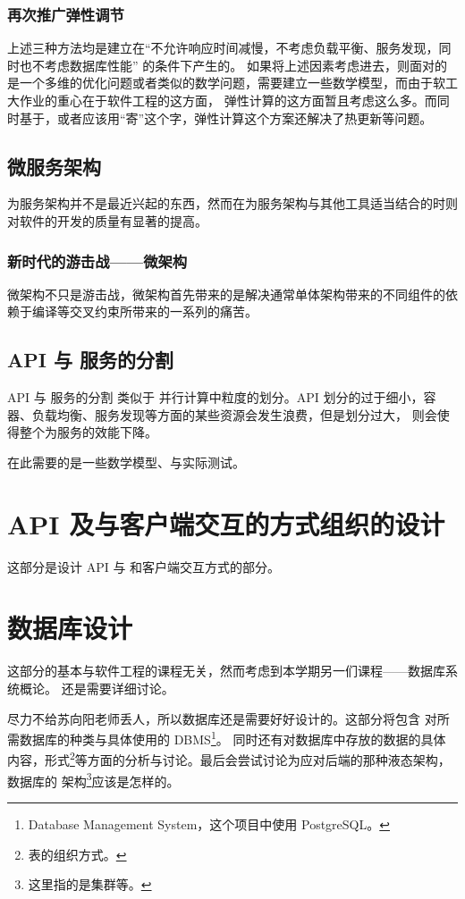 \subsubsection{再次推广弹性调节}
上述三种方法均是建立在“不允许响应时间减慢，不考虑负载平衡、服务发现，同时也不考虑数据库性能” 的条件下产生的。
如果将上述因素考虑进去，则面对的是一个多维的优化问题或者类似的数学问题，需要建立一些数学模型，而由于软工大作业的重心在于软件工程的这方面，
弹性计算的这方面暂且考虑这么多。而同时基于，或者应该用“寄”这个字，弹性计算这个方案还解决了热更新等问题。

\subsection{微服务架构}
为服务架构并不是最近兴起的东西，然而在为服务架构与其他工具适当结合的时则对软件的开发的质量有显著的提高。

\subsubsection{新时代的游击战——微架构}
微架构不只是游击战，微架构首先带来的是解决通常单体架构带来的不同组件的依赖于编译等交叉约束所带来的一系列的痛苦。

\subsection{API 与 服务的分割}
API 与 服务的分割 类似于 并行计算中粒度的划分。API 划分的过于细小，容器、负载均衡、服务发现等方面的某些资源会发生浪费，但是划分过大，
则会使得整个为服务的效能下降。

在此需要的是一些数学模型、与实际测试。

\section{API 及与客户端交互的方式组织的设计}
这部分是设计 API 与 和客户端交互方式的部分。
\section{数据库设计}
这部分的基本与软件工程的课程无关，然而考虑到本学期另一们课程——数据库系统概论。
还是需要详细讨论。

尽力不给苏向阳老师丢人，所以数据库还是需要好好设计的。这部分将包含 对所需数据库的种类与具体使用的 DBMS\footnote{Database Management System，这个项目中使用 PostgreSQL。}。
同时还有对数据库中存放的数据的具体内容，形式\footnote{表的组织方式。}等方面的分析与讨论。最后会尝试讨论为应对后端的那种液态架构，数据库的
架构\footnote{这里指的是集群等。}应该是怎样的。
